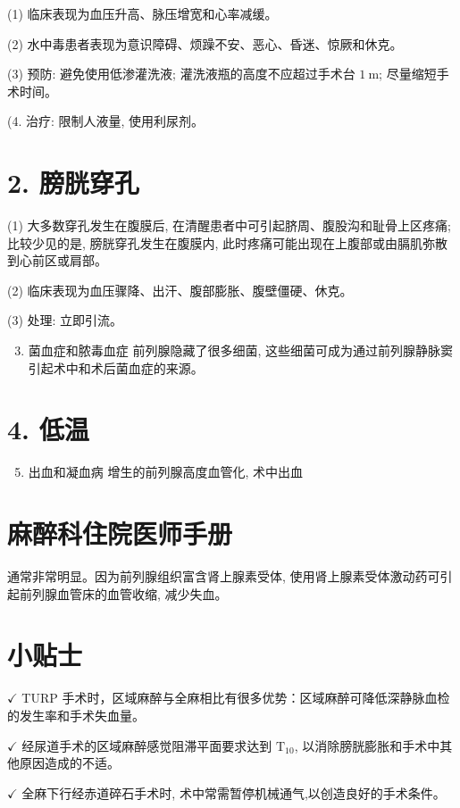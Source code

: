\documentclass[10pt]{article}
\begin{document}
(1) 临床表现为血压升高、脉压增宽和心率减缓。

(2) 水中毒患者表现为意识障碍、烦躁不安、恶心、昏迷、惊厥和休克。

(3) 预防: 避免使用低渗灌洗液; 灌洗液瓶的高度不应超过手术台 $1 \mathrm{~m}$; 尽量缩短手术时间。

(4. 治疗: 限制人液量, 使用利尿剂。

\section*{2. 膀胱穿孔}
(1) 大多数穿孔发生在腹膜后, 在清醒患者中可引起脐周、腹股沟和耻骨上区疼痛; 比较少见的是, 膀胱穿孔发生在腹膜内, 此时疼痛可能出现在上腹部或由膈肌弥散到心前区或肩部。

(2) 临床表现为血压骤降、出汗、腹部膨胀、腹壁僵硬、休克。

(3) 处理: 立即引流。

\begin{enumerate}
  \setcounter{enumi}{2}
  \item 菌血症和脓毒血症 前列腺隐藏了很多细菌, 这些细菌可成为通过前列腺静脉窦引起术中和术后菌血症的来源。
\end{enumerate}

\section*{4. 低温}
\begin{enumerate}
  \setcounter{enumi}{4}
  \item 出血和凝血病 增生的前列腺高度血管化, 术中出血
\end{enumerate}

\section*{麻醉科住院医师手册}
通常非常明显。因为前列腺组织富含肾上腺素受体, 使用肾上腺素受体激动药可引起前列腺血管床的血管收缩, 减少失血。

\section*{小贴士}
$\checkmark$ TURP 手术时，区域麻醉与全麻相比有很多优势：区域麻醉可降低深静脉血检的发生率和手术失血量。

$\checkmark$ 经尿道手术的区域麻醉感觉阻滞平面要求达到 $\mathrm{T}_{10}$, 以消除膀胱膨胀和手术中其他原因造成的不适。

$\checkmark$ 全麻下行经赤道碎石手术时, 术中常需暂停机械通气,以创造良好的手术条件。
\end{document}
